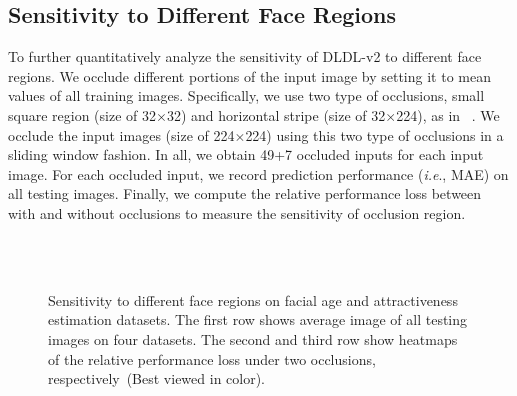 \documentclass[5p,times,twocolumn]{elsarticle}
\makeatletter
\DeclareRobustCommand\onedot{\@onedot}
\def\@onedot{.}
\def\ie{\emph{i.e}\onedot}
\makeatother
\begin{document}
\subsection{Sensitivity to Different Face Regions}
To further quantitatively analyze the sensitivity of DLDL-v2 to different face regions. We occlude different portions of the input image by setting it to mean values of all training images. Specifically, we use two type of occlusions, small square region (size of 32$\times$32) and horizontal stripe (size of 32$\times$224), as in ~\cite{zeiler2014visualizing, rothe2016deep}. We occlude the input images (size of 224$\times$224) using this two type of occlusions in a sliding window fashion. In all, we obtain 49+7 occluded inputs for each input image. For each occluded input, we record prediction performance (\ie, MAE) on all testing images. Finally, we compute the relative performance loss between with and without occlusions to measure the sensitivity of occlusion region.

\begin{figure}
    \captionsetup[subfigure]{labelformat=empty}
    \captionsetup[subfigure]{justification=centering}
    \centering
    \\ \vspace{-22pt}
    \\ \vspace{-22pt}
 \caption{Sensitivity to different face regions on facial age and attractiveness estimation datasets. The first row shows average image of all testing images on four datasets. The second and third row show heatmaps of the relative performance loss under two occlusions, respectively~(Best viewed in color).}\label{fig:occvi}  
 \vspace{-15pt}
\end{figure}
\end{document}
